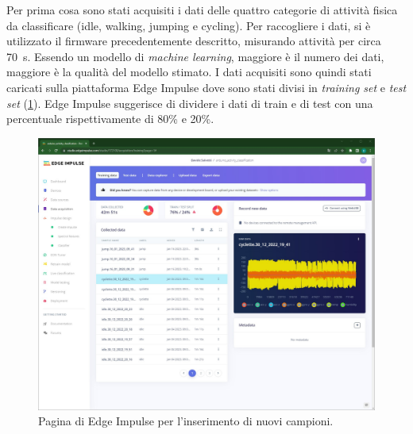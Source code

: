 Per prima cosa sono stati acquisiti i dati delle quattro categorie di attività fisica da classificare (idle, walking, jumping e cycling). Per raccogliere i dati, si è utilizzato il firmware precedentemente descritto, misurando attività per circa \SI{70}{\second}. Essendo un modello di \textit{machine learning}, maggiore è il numero dei dati, maggiore è la qualità del modello stimato. I dati acquisiti sono  quindi stati caricati sulla piattaforma Edge Impulse dove sono stati divisi in \textit{training set} e \textit{test set} (\Fig\ref{fig:acquisizione_dati}). Edge Impulse suggerisce di dividere i dati di train e di test con una percentuale rispettivamente di 80\% e 20\%.
\begin{figure}[h!]
	\centering
	\includegraphics[width=0.5\linewidth]{./ImageFiles/data_acquisition.jpg}
	\caption{Pagina di Edge Impulse per l'inserimento di nuovi campioni.}
	\label{fig:acquisizione_dati}
\end{figure}

